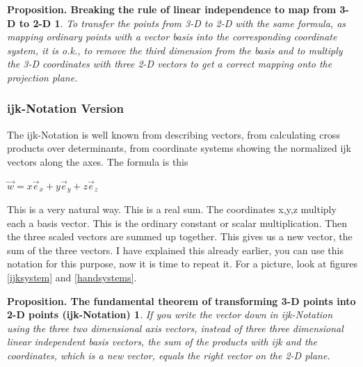 \documentclass[a4paper]{article}
\begin{document}
\begin{Example}
\newtheorem{VectorBasisBrokenLaw}{Proposition. Breaking the rule of linear independence to map from 3-D to 2-D}
\begin{VectorBasisBrokenLaw}
\label{broken_law_basis}
To transfer the points from 3-D to 2-D with the same formula, as mapping ordinary points with a vector basis into 
the corresponding coordinate system, it is o.k., to remove the third dimension from the basis and to multiply the
3-D coordinates with three 2-D vectors to get a correct mapping onto the projection plane.
\end{VectorBasisBrokenLaw}

\subsubsection{ijk-Notation Version}

The ijk-Notation is well known from describing vectors, from calculating cross products over determinants, from coordinate systems showing the normalized ijk vectors along the axes. The formula is this\\

\begin{center}
 $\vec{w} = x\vec{e}_{x}+y\vec{e}_{y}+z\vec{e}_{z}$
\end{center}

This is a very natural way. This is a real sum. The coordinates x,y,z multiply each a basis vector. This is the ordinary constant or scalar multiplication. Then the three scaled vectors are summed up together. This gives us a new vector, the sum of the three vectors. I have explained this already earlier, you can use this notation for this purpose, now it is time to repeat it. For a picture, look at figures \ref{ijksystem} and \ref{handsystems}.\\

\newtheorem{ijkVersion}{Proposition. The fundamental theorem of transforming 3-D points into 2-D points (ijk-Notation)}
\begin{ijkVersion}
If you write the vector down in ijk-Notation using the three two dimensional axis vectors, instead of three three dimensional linear independent basis vectors, the sum of the products with ijk and the coordinates, which is a new vector, equals the right vector on the 2-D plane.
\end{ijkVersion}


\end{Example}
\end{document}
